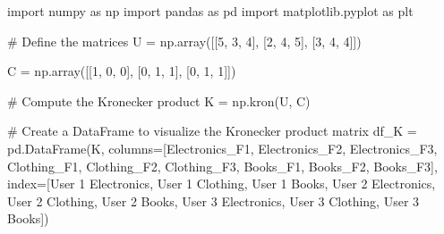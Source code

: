 \documentclass[
  letterpaper,
  DIV=11,
  numbers=noendperiod]{scrreprt}
\newenvironment{Shaded}{\begin{snugshade}}{\end{snugshade}}
\newcommand{\CommentTok}[1]{\textcolor[rgb]{0.37,0.37,0.37}{#1}}
\newcommand{\DecValTok}[1]{\textcolor[rgb]{0.68,0.00,0.00}{#1}}
\newcommand{\ImportTok}[1]{\textcolor[rgb]{0.00,0.46,0.62}{#1}}
\newcommand{\NormalTok}[1]{\textcolor[rgb]{0.00,0.23,0.31}{#1}}
\newcommand{\OperatorTok}[1]{\textcolor[rgb]{0.37,0.37,0.37}{#1}}
\newcommand{\StringTok}[1]{\textcolor[rgb]{0.13,0.47,0.30}{#1}}
\theoremstyle{plain}
\theoremstyle{definition}
\theoremstyle{remark}
\begin{document}
\begin{Shaded}
\begin{Highlighting}[]
\ImportTok{import}\NormalTok{ numpy }\ImportTok{as}\NormalTok{ np}
\ImportTok{import}\NormalTok{ pandas }\ImportTok{as}\NormalTok{ pd}
\ImportTok{import}\NormalTok{ matplotlib.pyplot }\ImportTok{as}\NormalTok{ plt}

\CommentTok{\# Define the matrices}
\NormalTok{U }\OperatorTok{=}\NormalTok{ np.array([[}\DecValTok{5}\NormalTok{, }\DecValTok{3}\NormalTok{, }\DecValTok{4}\NormalTok{],}
\NormalTok{              [}\DecValTok{2}\NormalTok{, }\DecValTok{4}\NormalTok{, }\DecValTok{5}\NormalTok{],}
\NormalTok{              [}\DecValTok{3}\NormalTok{, }\DecValTok{4}\NormalTok{, }\DecValTok{4}\NormalTok{]])}

\NormalTok{C }\OperatorTok{=}\NormalTok{ np.array([[}\DecValTok{1}\NormalTok{, }\DecValTok{0}\NormalTok{, }\DecValTok{0}\NormalTok{],}
\NormalTok{              [}\DecValTok{0}\NormalTok{, }\DecValTok{1}\NormalTok{, }\DecValTok{1}\NormalTok{],}
\NormalTok{              [}\DecValTok{0}\NormalTok{, }\DecValTok{1}\NormalTok{, }\DecValTok{1}\NormalTok{]])}

\CommentTok{\# Compute the Kronecker product}
\NormalTok{K }\OperatorTok{=}\NormalTok{ np.kron(U, C)}

\CommentTok{\# Create a DataFrame to visualize the Kronecker product matrix}
\NormalTok{df\_K }\OperatorTok{=}\NormalTok{ pd.DataFrame(K, }
\NormalTok{                    columns}\OperatorTok{=}\NormalTok{[}\StringTok{\textquotesingle{}Electronics\_F1\textquotesingle{}}\NormalTok{, }\StringTok{\textquotesingle{}Electronics\_F2\textquotesingle{}}\NormalTok{, }\StringTok{\textquotesingle{}Electronics\_F3\textquotesingle{}}\NormalTok{, }
                             \StringTok{\textquotesingle{}Clothing\_F1\textquotesingle{}}\NormalTok{, }\StringTok{\textquotesingle{}Clothing\_F2\textquotesingle{}}\NormalTok{, }\StringTok{\textquotesingle{}Clothing\_F3\textquotesingle{}}\NormalTok{, }
                             \StringTok{\textquotesingle{}Books\_F1\textquotesingle{}}\NormalTok{, }\StringTok{\textquotesingle{}Books\_F2\textquotesingle{}}\NormalTok{, }\StringTok{\textquotesingle{}Books\_F3\textquotesingle{}}\NormalTok{],}
\NormalTok{                    index}\OperatorTok{=}\NormalTok{[}\StringTok{\textquotesingle{}User 1 Electronics\textquotesingle{}}\NormalTok{, }\StringTok{\textquotesingle{}User 1 Clothing\textquotesingle{}}\NormalTok{, }\StringTok{\textquotesingle{}User 1 Books\textquotesingle{}}\NormalTok{, }
                           \StringTok{\textquotesingle{}User 2 Electronics\textquotesingle{}}\NormalTok{, }\StringTok{\textquotesingle{}User 2 Clothing\textquotesingle{}}\NormalTok{, }\StringTok{\textquotesingle{}User 2 Books\textquotesingle{}}\NormalTok{, }
                           \StringTok{\textquotesingle{}User 3 Electronics\textquotesingle{}}\NormalTok{, }\StringTok{\textquotesingle{}User 3 Clothing\textquotesingle{}}\NormalTok{, }\StringTok{\textquotesingle{}User 3 Books\textquotesingle{}}\NormalTok{])}


\end{Highlighting}
\end{Shaded}
\end{document}
